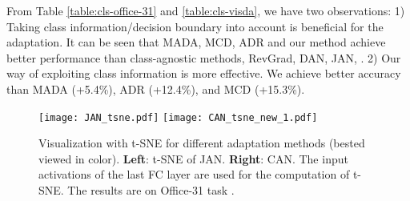 \documentclass[10pt,twocolumn,letterpaper]{article}
\begin{document}
From Table \ref{table:cls-office-31} and \ref{table:cls-visda}, we have two observations:
1) Taking class information/decision boundary into account is beneficial for the adaptation.
It can be seen that MADA, MCD, ADR and our method achieve
better performance than 
class-agnostic methods, 
\eg RevGrad, DAN, JAN, \etc.
2) Our way of exploiting class information is more effective. 
We achieve better accuracy than MADA (+5.4\%), ADR (+12.4\%), and MCD (+15.3\%).



































\begin{figure}[t]
\begin{center}
\texttt{[image: JAN\_tsne.pdf]}
\qquad
\texttt{[image: CAN\_tsne\_new\_1.pdf]}
\end{center}
\caption{\label{fig:tsne}
Visualization with t-SNE for different adaptation methods (bested viewed in color). \textbf{Left}: t-SNE of JAN. \textbf{Right}: CAN. The input activations of the last FC layer are used for the computation of t-SNE. The results are on Office-31 task .
}
\vspace{-4mm}
\end{figure}


\begin{figure*}[t]
\begin{center}
\par
{}
\end{center}
\vspace{-3mm}
\caption{\label{fig:metric-train}
(a-b) The curve of CDD and accuracy during training on task  of the Office-31 dataset.
The ``CDD-G" denotes the contrastive domain discrepancy computed with ground-truth target labels.
(c-d) The sensitivity of accuracy of CAN to .
The results for  (Left)
and  (Right)
are illustrated as examples. The trends for other tasks are similar.
}
\vspace{-3mm}
\end{figure*}
\end{document}
